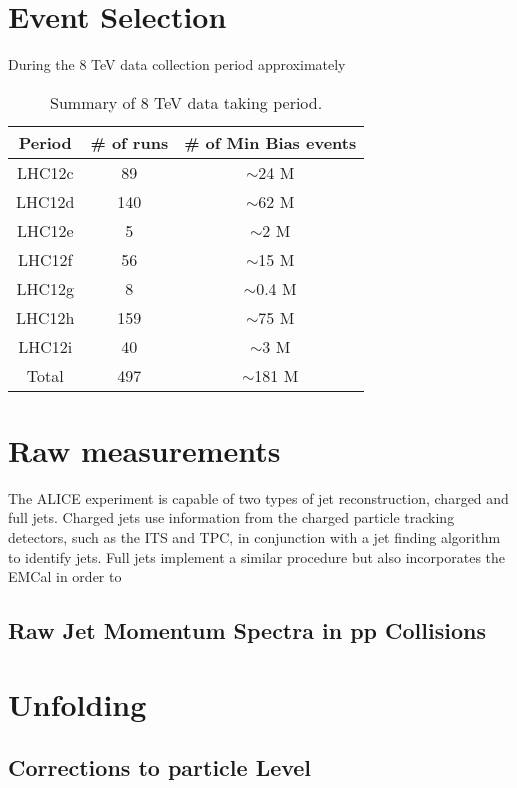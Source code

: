 \section{Event Selection}

During the 8 TeV data collection period approximately 

\begin{table}[hb]
\caption{Summary of 8 TeV data taking period.}
\label{tab:table-a}
\begin{center}
\begin{tabular}[b]{|c|c|c|}
	\hline
	Period & \# of runs & \# of Min Bias events \\ \hline
	LHC12c & 89 & $\sim$24 M \\ \hline
	LHC12d & 140 & $\sim$62 M \\ \hline
	LHC12e & 5 & $\sim$2 M \\ \hline
	LHC12f & 56 & $\sim$15 M \\ \hline
	LHC12g & 8 & $\sim$0.4 M \\ \hline
	LHC12h & 159 & $\sim$75 M \\ \hline
	LHC12i & 40 & $\sim$3 M \\ \hline
	Total & 497 & $\sim$181 M \\ \hline

\end{tabular}
\end{center}
\end{table}

\section{Raw measurements}
The ALICE experiment is capable of two types of jet reconstruction, charged and full jets.  Charged jets use information from the charged particle tracking detectors, such as the ITS and TPC, in conjunction with a jet finding algorithm to identify jets.  Full jets implement a similar procedure but also incorporates the EMCal in order to 

\subsection{Raw Jet Momentum Spectra in pp Collisions}

\section{Unfolding}

\subsection{Corrections to particle Level}

